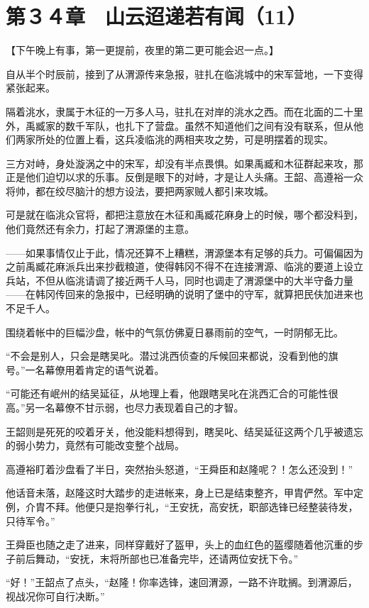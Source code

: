 \section{第３４章　山云迢递若有闻（11）}

【下午晚上有事，第一更提前，夜里的第二更可能会迟一点。】

自从半个时辰前，接到了从渭源传来急报，驻扎在临洮城中的宋军营地，一下变得紧张起来。

隔着洮水，隶属于木征的一万多人马，驻扎在对岸的洮水之西。而在北面的二十里外，禹臧家的数千军队，也扎下了营盘。虽然不知道他们之间有没有联系，但从他们两家所处的位置上看，这兵凌临洮的两相夹攻之势，可是明摆着的现实。

三方对峙，身处漩涡之中的宋军，却没有半点畏惧。如果禹臧和木征群起来攻，那正是他们迫切以求的乐事。反倒是眼下的对峙，才是让人头痛。王韶、高遵裕一众将帅，都在绞尽脑汁的想方设法，要把两家贼人都引来攻城。

可是就在临洮众官将，都把注意放在木征和禹臧花麻身上的时候，哪个都没料到，他们竟然还有余力，打起了渭源堡的主意。

——如果事情仅止于此，情况还算不上糟糕，渭源堡本有足够的兵力。可偏偏因为之前禹臧花麻派兵出来抄截粮道，使得韩冈不得不在连接渭源、临洮的要道上设立兵站，不但从临洮请调了接近两千人马，同时也调走了渭源堡中的大半守备力量——在韩冈传回来的急报中，已经明确的说明了堡中的守军，就算把民伕加进来也不足千人。

围绕着帐中的巨幅沙盘，帐中的气氛仿佛夏日暴雨前的空气，一时阴郁无比。

“不会是别人，只会是瞎吴叱。潜过洮西侦查的斥候回来都说，没看到他的旗号。”一名幕僚用着肯定的语气说着。

“可能还有岷州的结吴延征，从地理上看，他跟瞎吴叱在洮西汇合的可能性很高。”另一名幕僚不甘示弱，也尽力表现着自己的才智。

王韶则是死死的咬着牙关，他没能料想得到，瞎吴叱、结吴延征这两个几乎被遗忘的弱小势力，竟然有可能改变整个战局。

高遵裕盯着沙盘看了半日，突然抬头怒道，“王舜臣和赵隆呢？！怎么还没到！”

他话音未落，赵隆这时大踏步的走进帐来，身上已是结束整齐，甲胄俨然。军中定例，介胄不拜。他便只是抱拳行礼，“王安抚，高安抚，职部选锋已经整装待发，只待军令。”

王舜臣也随之走了进来，同样穿戴好了盔甲，头上的血红色的盔缨随着他沉重的步子前后舞动，“安抚，末将所部也已准备完毕，还请两位安抚下令。”

“好！”王韶点了点头，“赵隆！你率选锋，速回渭源，一路不许耽搁。到渭源后，视战况你可自行决断。”

